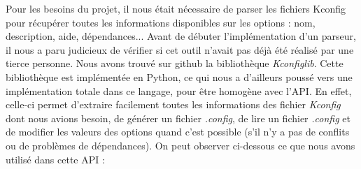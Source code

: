 \documentclass[17pts]{report}
\begin{document}
Pour les besoins du projet, il nous était nécessaire de parser les fichiers
Kconfig pour récupérer toutes les informations disponibles sur les options :
nom, description, aide, dépendances... Avant de débuter l'implémentation d'un
parseur, il nous a paru judicieux de vérifier si cet outil n'avait pas déjà été
réalisé par une tierce personne.
Nous avons trouvé sur github \cite{Existant:lib:kconfiglib} la bibliothèque
\textit{Kconfiglib}. Cette bibliothèque est implémentée en Python, ce qui nous
a d'ailleurs poussé vers une implémentation totale dans ce langage, pour être
homogène avec l'API. En effet, celle-ci permet d'extraire facilement toutes les
informations des fichier \textit{Kconfig} dont nous avions besoin, de générer
un fichier \textit{.config}, de lire un fichier \textit{.config} et de modifier
les valeurs des options quand c'est possible (s'il n'y a pas de conflits ou de
problèmes de dépendances).
On peut observer ci-dessous ce que nous avons utilisé dans cette API :
\end{document}

